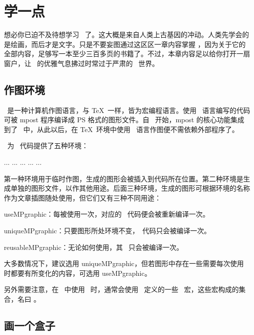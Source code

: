 \chapter{学一点 \MetaPost}

想必你已迫不及待想学习 \MetaPost\ 了。这大概是来自人类上古基因的冲动。人类先学会的是绘画，而后才是文字。只是不要妄图通过这区区一章内容掌握 \MetaPost，因为关于它的全部内容，足够写一本至少三百多页的书籍了。不过，本章内容足以给你打开一扇窗户，让 \MetaPost\ 的优雅气息拂过时常过于严肃的 \ConTeXt\ 世界。

\section{作图环境}

\MetaPost\ 是一种计算机作图语言，与 \TeX\ 一样，皆为宏编程语言。使用 \MetaPost\ 语言编写的代码可被 mpost 程序编译成 PS 格式的图形文件。自 \LuaTeX\ 开始，mpost 的核心功能集成到了 \LuaTeX\ 中，从此以后，在 \TeX\ 环境中使用 \MetaPost\ 语言作图便不需依赖外部程序了。

\ConTeXt\ 为 \MetaPost\ 代码提供了五种环境：

\starttyping
\startMPcode ... \stopMPcode
\startMPpage ... \stopMPpage
{} ... \stopuseMPgraphic
{} ... \stopuniqueMPgraphic
{} ... \stopreusableMPgraphic
\stoptyping

\noindent 第一种环境用于临时作图，生成的图形会被插入到代码所在位置。第二种环境是生成单独的图形文件，以作其他用途。后面三种环境，生成的图形可根据环境的名称作为文章插图随处使用，但它们又有三种不同用途：

\startitemize[nowhite]
\item useMPgraphic：每被使用一次，对应的 \MetaPost\ 代码便会被重新编译一次。
\item uniqueMPgraphic：只要图形所处环境不变，\MetaPost\ 代码只会被编译一次。
\item reusableMPgraphic：无论如何使用，其 \MetaPost\ 只会被编译一次。
\stopitemize

\noindent 大多数情况下，建议选用 uniqueMPgraphic，但若图形中存在一些需要每次使用时都要有所变化的内容，可选用 useMPgraphic。

另外需要注意，在 \ConTeXt\ 中使用 \MetaPost\ 时，通常会使用 \ConTeXt\ 定义的一些 \MetaPost\ 宏，这些宏构成的集合，名曰 \MetaFun。

\section{画一个盒子}

